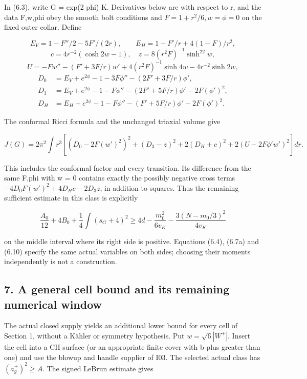 \documentclass[
  10pt,
]{article}
\begin{document}
In (6.3), write G = exp(2 phi) K. Derivatives below are with respect to
r, and the data F,w,phi obey the smooth bolt conditions and
\(F=1+r^2/6,w=\phi=0\) on the fixed outer collar. Define

\[
 E_V=1-F''/2-5F'/(2r),\qquad
 E_H=1-F'/r+4(1-F)/r^2,
\] \[
 c=4r^{-2}(\cosh2w-1),\quad z=8(r^2F)^{-1}\sinh^22w,
\] \[
 U=-Fw''-(F'+3F/r)w'+4(r^2F)^{-1}\sinh4w
                                        -4r^{-2}\sinh2w,
\] \[
\begin{aligned}
 D_0&=E_V+e^{2\phi}-1-3F\phi''-(2F'+3F/r)\phi',\\
 D_3&=E_V+e^{2\phi}-1-F\phi''-(2F'+5F/r)\phi'-2F(\phi')^2,\\
 D_H&=E_H+e^{2\phi}-1-F\phi''-(F'+5F/r)\phi'-2F(\phi')^2.
\end{aligned}
\]

The conformal Ricci formula and the unchanged triaxial volume give

\[
 \boxed{J(G)=2\pi^2\int r^3\left[
 (D_0-2F(w')^2)^2+(D_3-z)^2+2(D_H+c)^2
                    +2(U-2F\phi'w')^2\right]dr.}         \tag{6.10}
\]

This includes the conformal factor and every transition. Its difference
from the same F,phi with w = 0 contains exactly the possibly negative
cross terms \(-4D_0F(w')^2+4D_Hc-2D_3z\), in addition to squares. Thus
the remaining sufficient estimate in this class is explicitly

\[
 \frac{A_0}{12}+4B_0+\frac14\int(s_G+4)^2
 \ge4d-\frac{m_0^2}{6v_K}
                 -\frac{3(N-m_0/3)^2}{4v_K}              \tag{6.11}
\]

on the middle interval where its right side is positive. Equations
(6.4), (6.7a) and (6.10) specify the same actual variables on both
sides; choosing their moments independently is not a construction.

\hypertarget{a-general-cell-bound-and-its-remaining-numerical-window}{%
\subsection{7. A general cell bound and its remaining numerical
window}\label{a-general-cell-bound-and-its-remaining-numerical-window}}

The actual closed supply yields an additional lower bound for every cell
of Section 1, without a Kähler or symmetry hypothesis. Put
\(w=\sqrt6|W^+|\). Insert the cell into a CH surface (or an appropriate
finite cover with b-plus greater than one) and use the blowup and handle
supplier of I03. The selected actual class has \((a_g^+)^2\ge A\). The
signed LeBrun estimate gives
\end{document}
